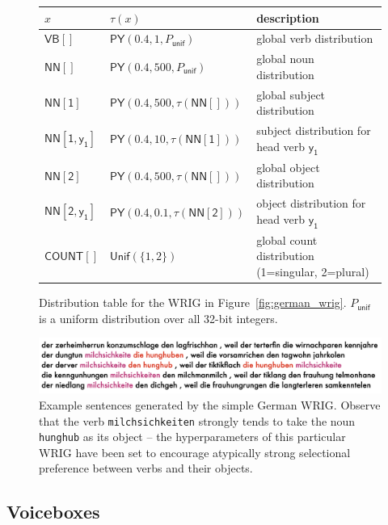 \documentclass[11pt]{article}
\renewcommand{\bnfpn}[1]{\mathsf{#1}}
\begin{document}
\begin{figure}[t]
\centering
\begin{tabular}{lll} 
$x$&$\tau(x)$&description\\
\hline \hline
$\bnfpn{VB[]}$ & $\mathsf{PY}(0.4, 1, P_{\mathsf{unif}})$ & global verb distribution \\
$\bnfpn{NN[]}$ & $\mathsf{PY}(0.4, 500, P_{\mathsf{unif}})$ & global noun distribution \\
$\bnfpn{NN[1]}$ & $\mathsf{PY}(0.4, 500, \tau(\bnfpn{NN[]}))$ & global subject distribution \\
$\bnfpn{NN[1, y_1]}$ & $\mathsf{PY}(0.4, 10, \tau(\bnfpn{NN[1]}))$ & subject distribution for head verb $\bnfpn{y_1}$ \\
$\bnfpn{NN[2]}$ & $\mathsf{PY}(0.4, 500, \tau(\bnfpn{NN[]}))$ & global object distribution \\
$\bnfpn{NN[2, y_1]}$ & $\mathsf{PY}(0.4, 0.1, \tau(\bnfpn{NN[2]}))$ & object distribution for head verb $\bnfpn{y_1}$ \\
$\bnfpn{COUNT[]}$ & $\mathsf{Unif}(\{1, 2\})$ & global count distribution (1=singular, 2=plural) \\
\end{tabular}
\caption{Distribution table for the WRIG in Figure~\ref{fig:german_wrig}. $P_{\mathsf{unif}}$ is a uniform distribution over all 32-bit integers. \label{fig:german_wrig_table}}
\end{figure}


\begin{figure}[t]
\centering
\includegraphics[width=1.0\textwidth]{images/german.png}
\caption{Example sentences generated by the simple German WRIG. Observe that the verb \texttt{milchsichkeiten} strongly tends to take the noun \texttt{hunghub} as its object -- the hyperparameters of this particular WRIG have been set to encourage atypically strong selectional preference between verbs and their objects. \label{fig:example_sents}}
\end{figure}



\subsection{Voiceboxes}
\end{document}
